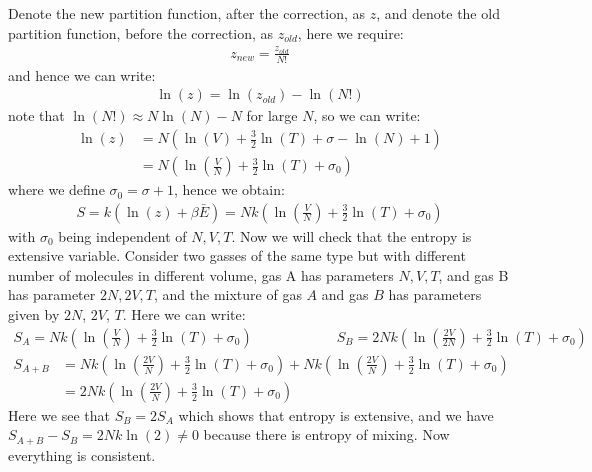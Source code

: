 \documentclass[11pt,oneside]{book}
\theoremstyle{break}
\theoremstyle{break}
\begin{document}
Denote the new partition function, after the correction, as $z$, and denote the old partition function, before the correction, as $z_{old}$, here we require:
\begin{align*}
z_{new} = \frac{z_{old}}{N!}
\end{align*}
and hence we can write:
\begin{align*}
\ln(z) = \ln(z_{old}) - \ln(N!)
\end{align*}
note that $\ln(N!) \approx N \ln(N) - N$ for large $N$, so we can write:
\begin{align*}
\ln(z) &= N\left( \ln(V) + \frac{3}{2}\ln(T) + \sigma - \ln(N) + 1\right) \\
&= N \left( \ln\left(\frac{V}{N}\right) +\frac{3}{2}\ln(T) + \sigma_0\right)
\end{align*}
where we define $\sigma_0 = \sigma + 1$, hence we obtain:
\begin{align*}
S = k\left(\ln(z) + \beta \bar{E} \right) = Nk\left( \ln\left(\frac{V}{N}\right) + \frac{3}{2}\ln(T) + \sigma_0\right)
\end{align*}
with $\sigma_0$ being independent of $N,V,T$. Now we will check that the entropy is extensive variable. Consider two gasses of the same type but with different number of molecules in different volume, gas A has parameters $N,V,T$, and gas B has parameter $2N, 2V, T$, and the mixture of gas $A$ and gas $B$ has parameters given by $2N$, $2V$, $T$. Here we can write:
\begin{align*}
S_A = Nk\left( \ln\left(\frac{V}{N}\right) + \frac{3}{2}\ln(T) + \sigma_0\right) \qquad\qquad\qquad
S_B = 2Nk\left( \ln\left(\frac{2V}{2N}\right) + \frac{3}{2}\ln(T) + \sigma_0\right)
\end{align*}
\begin{align*}
S_{A+B} &= Nk\left( \ln\left(\frac{2V}{N}\right) + \frac{3}{2}\ln(T) + \sigma_0\right)+  Nk\left( \ln\left(\frac{2V}{N}\right) + \frac{3}{2}\ln(T) + \sigma_0\right)\\
&= 2Nk\left( \ln\left(\frac{2V}{N}\right) + \frac{3}{2}\ln(T) + \sigma_0\right)
\end{align*}
Here we see that $S_B = 2S_A$ which shows that entropy is extensive, and we have $S_{A+B} - S_B = 2Nk\ln(2) \neq 0$ because there is entropy of mixing. Now everything is consistent. \\
\newpage



\newpage
\end{document}
